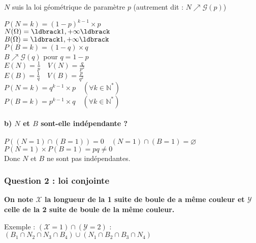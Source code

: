 \documentclass[a4paper, 12pt]{article}
\begin{document}
$N$ suis la loi géométrique de paramètre $p$ (autrement dit : $N \nearrow \mathcal{G} (p)$) \\

\begin{flushleft}
$P (N = k) = (1 - p)^{k - 1} \times p$ \\
$N(\Omega) = \ldbrack 1, +\infty \ldbrack$ \\
$B(\Omega) = \ldbrack 1, +\infty \ldbrack$ \\
$P (B = k) = (1 - q) \times q$ \\
$B \nearrow \mathcal{G}(q)$ pour $q = 1 - p$ \\
$E(N) = \frac{1}{p} \quad V(N) = \frac{q}{p^2}$ \\
$E(B) = \frac{1}{q} \quad V(B) = \frac{p}{q^2}$ \\
$P (N = k) = q^{k - 1} \times p \quad (\forall k \in \mathbb{N}^*)$ \\
$P (B = k) = p^{k - 1} \times q \quad (\forall k \in \mathbb{N}^*)$ \\
\end{flushleft}


\paragraph{b) $N$ et $B$ sont-elle indépendante ? \\}
\begin{flushleft}
$P ((N = 1) \cap (B = 1)) = 0 \quad (N = 1) \cap (B = 1) = \varnothing$ \\
$P(N = 1) \times P (B = 1) = pq \neq 0$ \\
Donc $N$ et $B$ ne sont pas indépendantes.
\end{flushleft}


\subsubsection{Question 2 : loi conjointe}
\textbf{On note $\mathcal{X}$ la longueur de la 1 suite de boule de a même couleur et $\mathcal{Y}$ celle de la 2 suite de boule de la même couleur.}

\begin{flushleft}
Exemple : $(\mathcal{X} = 1) \cap (\mathcal{Y} = 2)$ : $(B_1 \cap N_2 \cap N_3 \cap B_4) \cup (N_1 \cap B_2 \cap B_3 \cap N_4)$
\end{flushleft}
\end{document}
